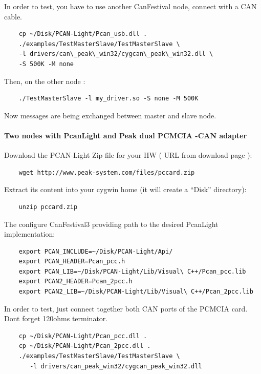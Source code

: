 \documentclass[12pt,english,a4paper]{book}
\begin{document}
In order to test, you have to use another CanFestival node, connect
with a CAN cable.


\begin{verbatim}
	cp ~/Disk/PCAN-Light/Pcan_usb.dll .
	./examples/TestMasterSlave/TestMasterSlave \
	-l drivers/can\_peak\_win32/cygcan\_peak\_win32.dll \
	-S 500K -M none
\end{verbatim}


Then, on the other node :


\begin{verbatim}
	./TestMasterSlave -l my_driver.so -S none -M 500K
\end{verbatim}


Now messages are being exchanged between master and slave node.

\paragraph{Two nodes with PcanLight and Peak dual PCMCIA -CAN adapter}

Download the PCAN-Light Zip file for your HW ( URL from download
page ):


\begin{verbatim}
	wget http://www.peak-system.com/files/pccard.zip
\end{verbatim}


Extract its content into your cygwin home (it will create a {}``Disk''
directory):


\begin{verbatim}
	unzip pccard.zip
\end{verbatim}


The configure CanFestival3 providing path to the desired PcanLight
implementation:


\begin{verbatim}
	export PCAN_INCLUDE=~/Disk/PCAN-Light/Api/
	export PCAN_HEADER=Pcan_pcc.h
	export PCAN_LIB=~/Disk/PCAN-Light/Lib/Visual\ C++/Pcan_pcc.lib
	export PCAN2_HEADER=Pcan_2pcc.h
	export PCAN2_LIB=~/Disk/PCAN-Light/Lib/Visual\ C++/Pcan_2pcc.lib
\end{verbatim}


In order to test, just connect together both CAN ports of the PCMCIA
card. Don{\textquotesingle}t forget 120ohms terminator.


\begin{verbatim}
	cp ~/Disk/PCAN-Light/Pcan_pcc.dll .
	cp ~/Disk/PCAN-Light/Pcan_2pcc.dll .
	./examples/TestMasterSlave/TestMasterSlave \
	   -l drivers/can_peak_win32/cygcan_peak_win32.dll
\end{verbatim}
\end{document}
